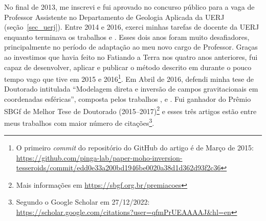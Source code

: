 \documentclass[10pt,a4paper,oneside]{book}
\begin{document}
No final de 2013, me inscrevi e fui aprovado no concurso público para a vaga de
Professor Assistente no Departamento de Geologia Aplicada da UERJ
(seção~\ref{sec_uerj}).
Entre 2014 e 2016, exerci minhas tarefas de docente da UERJ enquanto terminava
os trabalhos \citet{Uieda2016} e \citet{Uieda2017}.
Esses dois anos foram muito desafiadores, principalmente no período de
adaptação ao meu novo cargo de Professor.
Graças ao investimos que havia feito no Fatiando a Terra nos quatro anos
anteriores, fui capaz de desenvolver, aplicar e publicar o método descrito em
\citet{Uieda2017} durante o pouco tempo vago que tive em 2015 e
2016\footnote{O primeiro \textit{commit} do repositório do GitHub do artigo é
de Março de 2015: \url{https://github.com/pinga-lab/paper-moho-inversion-tesseroids/commit/edd0e33a200bd1946be0020a38d1d362d93f2c36}}.
Em Abril de 2016, defendi minha tese de Doutorado intitulada ``Modelagem direta
e inversão de campos gravitacionais em coordenadas esféricas'', composta pelos
trabalhos \citet{Uieda2013}, \citet{Uieda2016} e \citet{Uieda2017}.
Fui ganhador do Prêmio SBGf de Melhor Tese de Doutorado
(2015--2017)\footnote{Mais informações em \url{https://sbgf.org.br/premiacoes}}
e esses três artigos estão entre meus trabalhos com maior número de
citações\footnote{Segundo o Google Scholar em 27/12/2022:
\url{https://scholar.google.com/citations?user=qfmPrUEAAAAJ&hl=en}}.
\end{document}
